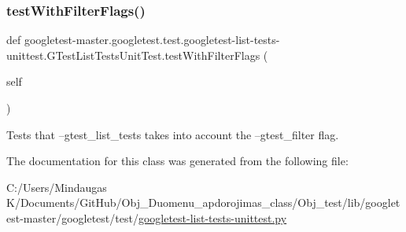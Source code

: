 \subsubsection{\texorpdfstring{testWithFilterFlags()}{testWithFilterFlags()}}
{\footnotesize\ttfamily def googletest-\/master.\+googletest.\+test.\+googletest-\/list-\/tests-\/unittest.\+G\+Test\+List\+Tests\+Unit\+Test.\+test\+With\+Filter\+Flags (\begin{DoxyParamCaption}\item[{}]{self }\end{DoxyParamCaption})}

\begin{DoxyVerb}Tests that --gtest_list_tests takes into account the
--gtest_filter flag.\end{DoxyVerb}
 

The documentation for this class was generated from the following file\+:\begin{DoxyCompactItemize}
\item 
C\+:/\+Users/\+Mindaugas K/\+Documents/\+Git\+Hub/\+Obj\+\_\+\+Duomenu\+\_\+apdorojimas\+\_\+class/\+Obj\+\_\+test/lib/googletest-\/master/googletest/test/\mbox{\hyperlink{_obj__test_2lib_2googletest-master_2googletest_2test_2googletest-list-tests-unittest_8py}{googletest-\/list-\/tests-\/unittest.\+py}}\end{DoxyCompactItemize}
